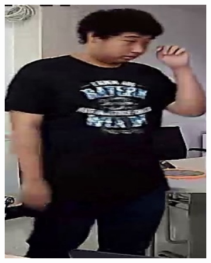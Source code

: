 \begin{figure}[!ht]
    \centering
    \begin{subfigure}[b]{0.2\textwidth}
        \centering
        \includegraphics[width=\textwidth]{chapter4/images/o_0.jpg}
        \label{fig:ex_1}
    \end{subfigure}
    \begin{subfigure}[b]{0.2\textwidth}
        \centering

\end{subfigure}
\end{figure}
